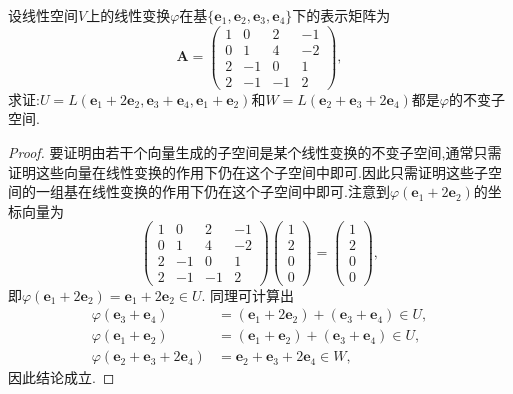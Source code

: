 \documentclass[lang=cn,newtx,10pt,scheme=chinese]{elegantbook}
\begin{document}
\begin{example}
设线性空间\(V\)上的线性变换\(\varphi\)在基\(\{\boldsymbol{e}_1,\boldsymbol{e}_2,\boldsymbol{e}_3,\boldsymbol{e}_4\}\)下的表示矩阵为
\[
\boldsymbol{A}=\begin{pmatrix}
1&0&2&-1\\
0&1&4&-2\\
2&-1&0&1\\
2&-1&-1&2
\end{pmatrix},
\]
求证:\(U = L(\boldsymbol{e}_1 + 2\boldsymbol{e}_2,\boldsymbol{e}_3 + \boldsymbol{e}_4,\boldsymbol{e}_1 + \boldsymbol{e}_2)\)和\(W = L(\boldsymbol{e}_2 + \boldsymbol{e}_3 + 2\boldsymbol{e}_4)\)都是\(\varphi\)的不变子空间.
\end{example}
\begin{proof}
要证明由若干个向量生成的子空间是某个线性变换的不变子空间,通常只需证明这些向量在线性变换的作用下仍在这个子空间中即可.因此只需证明这些子空间的一组基在线性变换的作用下仍在这个子空间中即可.注意到\(\varphi(\boldsymbol{e}_1 + 2\boldsymbol{e}_2)\)的坐标向量为
\[
\begin{pmatrix}
1&0&2&-1\\
0&1&4&-2\\
2&-1&0&1\\
2&-1&-1&2
\end{pmatrix}
\begin{pmatrix}
1\\
2\\
0\\
0
\end{pmatrix}=
\begin{pmatrix}
1\\
2\\
0\\
0
\end{pmatrix},
\]
即\(\varphi(\boldsymbol{e}_1 + 2\boldsymbol{e}_2)=\boldsymbol{e}_1 + 2\boldsymbol{e}_2\in U\). 同理可计算出
\begin{align*}
\varphi(\boldsymbol{e}_3 + \boldsymbol{e}_4)&=(\boldsymbol{e}_1 + 2\boldsymbol{e}_2)+(\boldsymbol{e}_3 + \boldsymbol{e}_4)\in U,\\
\varphi(\boldsymbol{e}_1 + \boldsymbol{e}_2)&=(\boldsymbol{e}_1 + \boldsymbol{e}_2)+(\boldsymbol{e}_3 + \boldsymbol{e}_4)\in U,\\
\varphi(\boldsymbol{e}_2 + \boldsymbol{e}_3 + 2\boldsymbol{e}_4)&=\boldsymbol{e}_2 + \boldsymbol{e}_3 + 2\boldsymbol{e}_4\in W,
\end{align*}
因此结论成立. 
\end{proof}
\end{document}
